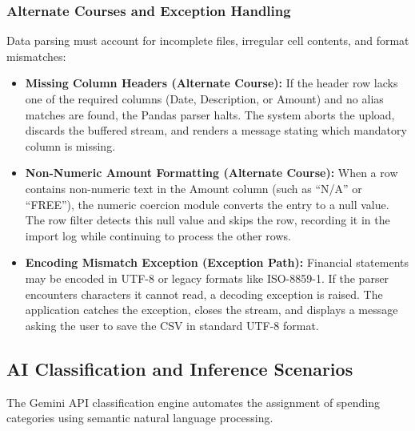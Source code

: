 \subsubsection{Alternate Courses and Exception Handling}
Data parsing must account for incomplete files, irregular cell contents, and format mismatches:
\begin{itemize}
	\item \textbf{Missing Column Headers (Alternate Course):} If the header row lacks one of the required columns (Date, Description, or Amount) and no alias matches are found, the Pandas parser halts. The system aborts the upload, discards the buffered stream, and renders a message stating which mandatory column is missing.
	\item \textbf{Non-Numeric Amount Formatting (Alternate Course):} When a row contains non-numeric text in the Amount column (such as ``N/A'' or ``FREE''), the numeric coercion module converts the entry to a null value. The row filter detects this null value and skips the row, recording it in the import log while continuing to process the other rows.
	\item \textbf{Encoding Mismatch Exception (Exception Path):} Financial statements may be encoded in UTF-8 or legacy formats like ISO-8859-1. If the parser encounters characters it cannot read, a decoding exception is raised. The application catches the exception, closes the stream, and displays a message asking the user to save the CSV in standard UTF-8 format.
\end{itemize}

\subsection{AI Classification and Inference Scenarios}
The Gemini API classification engine automates the assignment of spending categories using semantic natural language processing.
